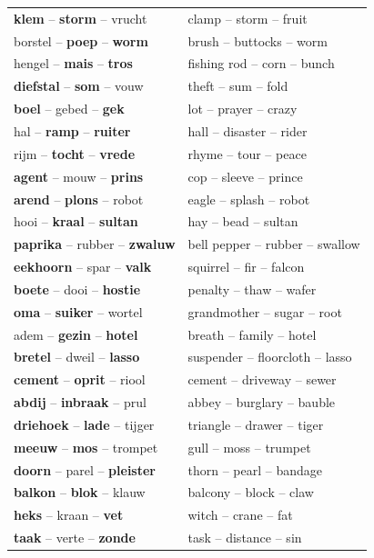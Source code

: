 \documentclass[doc]{apa6}
\begin{document}
\begin{appendix}
\begin{small}
\begin{longtable}{ll}
\textbf{klem} -- \textbf{storm} -- vrucht & clamp -- storm -- fruit\\
borstel -- \textbf{poep} -- \textbf{worm} & brush -- buttocks -- worm\\
hengel -- \textbf{mais} -- \textbf{tros} & fishing rod -- corn -- bunch\\
\textbf{diefstal} -- \textbf{som} -- vouw & theft -- sum -- fold\\
\textbf{boel} -- gebed -- \textbf{gek} & lot -- prayer -- crazy\\
hal -- \textbf{ramp} -- \textbf{ruiter} & hall -- disaster -- rider\\
rijm -- \textbf{tocht} -- \textbf{vrede} & rhyme -- tour -- peace\\
\textbf{agent} -- mouw -- \textbf{prins} & cop -- sleeve -- prince\\
\textbf{arend} -- \textbf{plons} -- robot & eagle -- splash -- robot\\
hooi -- \textbf{kraal} -- \textbf{sultan} & hay -- bead -- sultan\\
\textbf{paprika} -- rubber -- \textbf{zwaluw} & bell pepper -- rubber -- swallow\\
\textbf{eekhoorn} -- spar -- \textbf{valk} & squirrel -- fir -- falcon\\
\textbf{boete} -- dooi -- \textbf{hostie} & penalty -- thaw -- wafer\\
\textbf{oma} -- \textbf{suiker} -- wortel & grandmother -- sugar -- root\\
adem -- \textbf{gezin} -- \textbf{hotel} & breath -- family -- hotel\\
\textbf{bretel} -- dweil -- \textbf{lasso} & suspender -- floorcloth -- lasso\\
\textbf{cement} -- \textbf{oprit} -- riool & cement -- driveway -- sewer\\
\textbf{abdij} -- \textbf{inbraak} -- prul & abbey -- burglary -- bauble\\
\textbf{driehoek} -- \textbf{lade} -- tijger & triangle -- drawer -- tiger\\
\textbf{meeuw} -- \textbf{mos} -- trompet & gull -- moss -- trumpet\\
\textbf{doorn} -- parel -- \textbf{pleister} & thorn -- pearl -- bandage\\
\textbf{balkon} -- \textbf{blok} -- klauw & balcony -- block -- claw\\
\textbf{heks} -- kraan -- \textbf{vet} & witch -- crane -- fat\\
\textbf{taak} -- verte -- \textbf{zonde} & task -- distance -- sin\\

\end{longtable}
\end{small}
\end{appendix}
\end{document}
